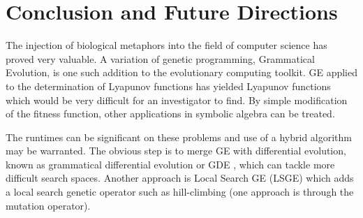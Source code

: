 \documentclass[12pt]{article}
\begin{document}
\section{Conclusion and Future Directions}

The injection of biological metaphors into the field of computer
science has proved very valuable. A variation of genetic programming,
Grammatical Evolution, is one such addition to the evolutionary
computing toolkit.  GE applied to the determination of Lyapunov
functions has yielded Lyapunov functions which would be very difficult
for an investigator to find.  By simple modification of the fitness
function, other applications in symbolic algebra can be treated.

The runtimes can be significant on these problems and use of a hybrid
algorithm may be warranted.  The obvious step is to merge GE with
differential evolution, known as grammatical differential evolution or
GDE \cite{oneill:2006:gde}, which can tackle more difficult search
spaces.  Another approach is Local Search GE (LSGE) which adds a local
search genetic operator such as hill-climbing (one approach is through
the mutation operator).

\newpage

%
%

%




\begin{comment}
self.model = Sequential()
        self.model.add(LSTM(1, input_shape=(6,1)))
        self.model.add(Dense(3))
        self.model.compile(loss='mean_squared_error', optimizer='adam')
epochs = 20
training datasets = 3000

LSTM nodes = 1   Loss = 22.02988673865795
LSTM nodes = 2   Loss = 4.7541071283817296
LSTM nodes = 3   Loss = 1.0286707907915116
LSTM nodes = 4   Loss = 1.5408772403001785
LSTM nodes = 5   Loss = 3.530536
LSTM nodes = 6   Loss = 0.54314744
LSTM nodes = 7   Loss = 0.3609107
LSTM nodes = 8   Loss = 0.4556496
LSTM nodes = 9   Loss = 0.9998089886456728
LSTM nodes = 10  Loss = 0.4759439
LSTM nodes = 11  Loss = 0.9570983
LSTM nodes = 12  Loss = 

change the noise
cuda in keras

\end{comment}
\end{document}
